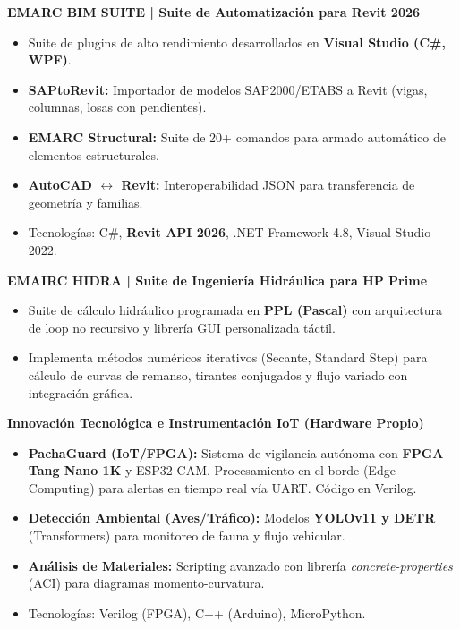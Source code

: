 \documentclass[10pt, a4paper]{article}
\begin{document}
\vspace{2mm}

\textbf{EMARC BIM SUITE | Suite de Automatización para Revit 2026}
\begin{itemize}
    \item Suite de plugins de alto rendimiento desarrollados en \textbf{Visual Studio (C\#, WPF)}.
    \item \textbf{SAPtoRevit:} Importador de modelos SAP2000/ETABS a Revit (vigas, columnas, losas con pendientes).
    \item \textbf{EMARC Structural:} Suite de 20+ comandos para armado automático de elementos estructurales.
    \item \textbf{AutoCAD $\leftrightarrow$ Revit:} Interoperabilidad JSON para transferencia de geometría y familias.
    \item Tecnologías: C\#, \textbf{Revit API 2026}, .NET Framework 4.8, Visual Studio 2022.
\end{itemize}

\vspace{2mm}

\textbf{EMAIRC HIDRA | Suite de Ingeniería Hidráulica para HP Prime}
\begin{itemize}
    \item Suite de cálculo hidráulico programada en \textbf{PPL (Pascal)} con arquitectura de loop no recursivo y librería GUI personalizada táctil.
    \item Implementa métodos numéricos iterativos (Secante, Standard Step) para cálculo de curvas de remanso, tirantes conjugados y flujo variado con integración gráfica.
\end{itemize}

\vspace{2mm}

\textbf{Innovación Tecnológica e Instrumentación IoT (Hardware Propio)}
\begin{itemize}
    \item \textbf{PachaGuard (IoT/FPGA):} Sistema de vigilancia autónoma con \textbf{FPGA Tang Nano 1K} y ESP32-CAM. Procesamiento en el borde (Edge Computing) para alertas en tiempo real vía UART. Código en Verilog.
    \item \textbf{Detección Ambiental (Aves/Tráfico):} Modelos \textbf{YOLOv11 y DETR} (Transformers) para monitoreo de fauna y flujo vehicular.
    \item \textbf{Análisis de Materiales:} Scripting avanzado con librería \textit{concrete-properties} (ACI) para diagramas momento-curvatura.
    \item Tecnologías: Verilog (FPGA), C++ (Arduino), MicroPython.
\end{itemize}
\end{document}
